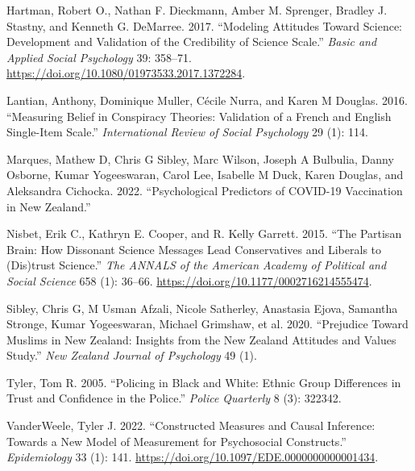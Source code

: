 \documentclass[
  singlecolumn]{report}
\newlength{\cslhangindent}
\newlength{\cslentryspacingunit} %
\newenvironment{CSLReferences}[2] %
 {%
  \setlength{\parindent}{0pt}
  \ifodd #1
  \let\oldpar\par
  \def\par{\hangindent=\cslhangindent\oldpar}
  \fi
  \setlength{\parskip}{#2\cslentryspacingunit}
 }%
 {}
\begin{document}
\hypertarget{refs}{}
\begin{CSLReferences}{1}{0}
\leavevmode{}%
Hartman, Robert O., Nathan F. Dieckmann, Amber M. Sprenger, Bradley J.
Stastny, and Kenneth G. DeMarree. 2017. {``Modeling Attitudes Toward
Science: Development and Validation of the Credibility of Science
Scale.''} \emph{Basic and Applied Social Psychology} 39: 358--71.
\url{https://doi.org/10.1080/01973533.2017.1372284}.

\leavevmode{}%
Lantian, Anthony, Dominique Muller, Cécile Nurra, and Karen M Douglas.
2016. {``Measuring Belief in Conspiracy Theories: Validation of a French
and English Single-Item Scale.''} \emph{International Review of Social
Psychology} 29 (1): 114.

\leavevmode{}%
Marques, Mathew D, Chris G Sibley, Marc Wilson, Joseph A Bulbulia, Danny
Osborne, Kumar Yogeeswaran, Carol Lee, Isabelle M Duck, Karen Douglas,
and Aleksandra Cichocka. 2022. {``Psychological Predictors of COVID-19
Vaccination in New Zealand.''}

\leavevmode{}%
Nisbet, Erik C., Kathryn E. Cooper, and R. Kelly Garrett. 2015. {``The
Partisan Brain: How Dissonant Science Messages Lead Conservatives and
Liberals to (Dis)trust Science.''} \emph{The ANNALS of the American
Academy of Political and Social Science} 658 (1): 36--66.
\url{https://doi.org/10.1177/0002716214555474}.

\leavevmode{}%
Sibley, Chris G, M Usman Afzali, Nicole Satherley, Anastasia Ejova,
Samantha Stronge, Kumar Yogeeswaran, Michael Grimshaw, et al. 2020.
{``Prejudice Toward Muslims in New Zealand: Insights from the New
Zealand Attitudes and Values Study.''} \emph{New Zealand Journal of
Psychology} 49 (1).

\leavevmode{}%
Tyler, Tom R. 2005. {``Policing in Black and White: Ethnic Group
Differences in Trust and Confidence in the Police.''} \emph{Police
Quarterly} 8 (3): 322342.

\leavevmode{}%
VanderWeele, Tyler J. 2022. {``Constructed Measures and Causal
Inference: Towards a New Model of Measurement for Psychosocial
Constructs.''} \emph{Epidemiology} 33 (1): 141.
\url{https://doi.org/10.1097/EDE.0000000000001434}.

\end{CSLReferences}
\end{document}
